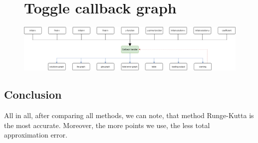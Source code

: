 \documentclass[12pt,letterpaper]{article}
\begin{document}
\begin{figure}[!h]
    \begin{center}
        \section*{Toggle callback graph}
    \end{center}
    \centering
        \includegraphics[width=1\linewidth]{callback.png}
\end{figure}

\begin{center}
    \section*{Conclusion}
\end{center}
All in all, after comparing all methods, we can note, that method Runge-Kutta is the most accurate. Moreover, the more points we use, the less total approximation error.
\end{document}
